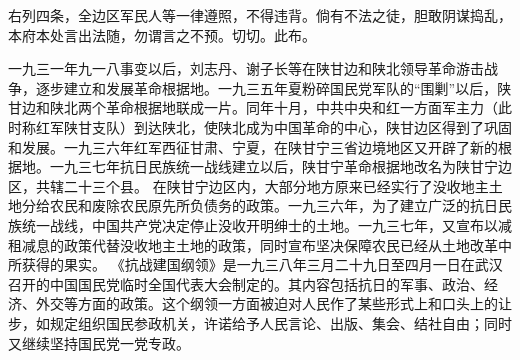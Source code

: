 右列四条，全边区军民人等一律遵照，不得违背。倘有不法之徒，胆敢阴谋捣乱，本府本处言出法随，勿谓言之不预。切切。此布。


\begin{maonote}
一九三一年九一八事变以后，刘志丹、谢子长等在陕甘边和陕北领导革命游击战争，逐步建立和发展革命根据地。一九三五年夏粉碎国民党军队的“围剿”以后，陕甘边和陕北两个革命根据地联成一片。同年十月，中共中央和红一方面军主力（此时称红军陕甘支队）到达陕北，使陕北成为中国革命的中心，陕甘边区得到了巩固和发展。一九三六年红军西征甘肃、宁夏，在陕甘宁三省边境地区又开辟了新的根据地。一九三七年抗日民族统一战线建立以后，陕甘宁革命根据地改名为陕甘宁边区，共辖二十三个县。
在陕甘宁边区内，大部分地方原来已经实行了没收地主土地分给农民和废除农民原先所负债务的政策。一九三六年，为了建立广泛的抗日民族统一战线，中国共产党决定停止没收开明绅士的土地。一九三七年，又宣布以减租减息的政策代替没收地主土地的政策，同时宣布坚决保障农民已经从土地改革中所获得的果实。
《抗战建国纲领》是一九三八年三月二十九日至四月一日在武汉召开的中国国民党临时全国代表大会制定的。其内容包括抗日的军事、政治、经济、外交等方面的政策。这个纲领一方面被迫对人民作了某些形式上和口头上的让步，如规定组织国民参政机关，许诺给予人民言论、出版、集会、结社自由；同时又继续坚持国民党一党专政。
\end{maonote}
